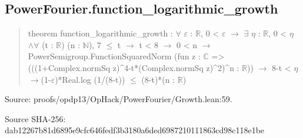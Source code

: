 \documentclass[11pt,a4paper]{article}
\begin{document}
\begin{samepage}
\subsection{PowerFourier.function\_logarithmic\_growth}
\begin{quote}\small\ttfamily theorem function\_logarithmic\_growth : \ensuremath{\forall} \ensuremath{\varepsilon} : \ensuremath{\mathbb{R}}, 0 < \ensuremath{\varepsilon} \ensuremath{\to} \ensuremath{\exists} \ensuremath{\eta} : \ensuremath{\mathbb{R}}, 0 < \ensuremath{\eta} \ensuremath{\wedge}\newline     \ensuremath{\forall} (t : \ensuremath{\mathbb{R}}) (n : \ensuremath{\mathbb{N}}), 7 \ensuremath{\leq} t \ensuremath{\to} t < 8 \ensuremath{\to} 0 < n \ensuremath{\to}\newline       PowerSemigroup.FunctionSquaredNorm (fun z : \ensuremath{\mathbb{C}} =>\newline         (((1+Complex.normSq z)\textasciicircum{}4-t*(Complex.normSq z)\textasciicircum{}2)\textasciicircum{}n : \ensuremath{\mathbb{R}})) \ensuremath{\to} 8-t < \ensuremath{\eta} \ensuremath{\to}\newline       (1-\ensuremath{\varepsilon})*Real.log (1/(8-t)) \ensuremath{\leq} (8-t)*(n : \ensuremath{\mathbb{R}})\end{quote}
{\small Source: proofs/opdp13/OpHack/PowerFourier/Growth.lean:59.\par}

{\small Source SHA-256: dab12267b81d6895e9cfc646fedf3b3180a6ded6987210111863cd98c118e1be\par}

\end{samepage}
\end{document}
